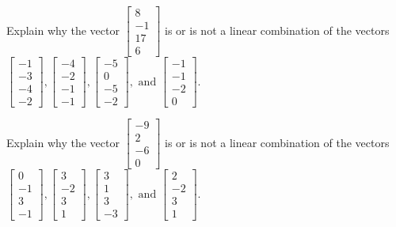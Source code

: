 \documentclass{article}
\begin{document}
\begin{exerciseStatement}
    Explain why the vector \(\left[\begin{array}{c}
8 \\
-1 \\
17 \\
6
\end{array}\right]\)  is or is not a linear
combination of the vectors \(\left[\begin{array}{c}
-1 \\
-3 \\
-4 \\
-2
\end{array}\right] , \left[\begin{array}{c}
-4 \\
-2 \\
-1 \\
-1
\end{array}\right] , \left[\begin{array}{c}
-5 \\
0 \\
-5 \\
-2
\end{array}\right] , \text{ and } \left[\begin{array}{c}
-1 \\
-1 \\
-2 \\
0
\end{array}\right]\).



  
\end{exerciseStatement}

\begin{exerciseStatement}
    Explain why the vector \(\left[\begin{array}{c}
-9 \\
2 \\
-6 \\
0
\end{array}\right]\)  is or is not a linear
combination of the vectors \(\left[\begin{array}{c}
0 \\
-1 \\
3 \\
-1
\end{array}\right] , \left[\begin{array}{c}
3 \\
-2 \\
3 \\
1
\end{array}\right] , \left[\begin{array}{c}
3 \\
1 \\
3 \\
-3
\end{array}\right] , \text{ and } \left[\begin{array}{c}
2 \\
-2 \\
3 \\
1
\end{array}\right]\).



  
\end{exerciseStatement}
\end{document}
